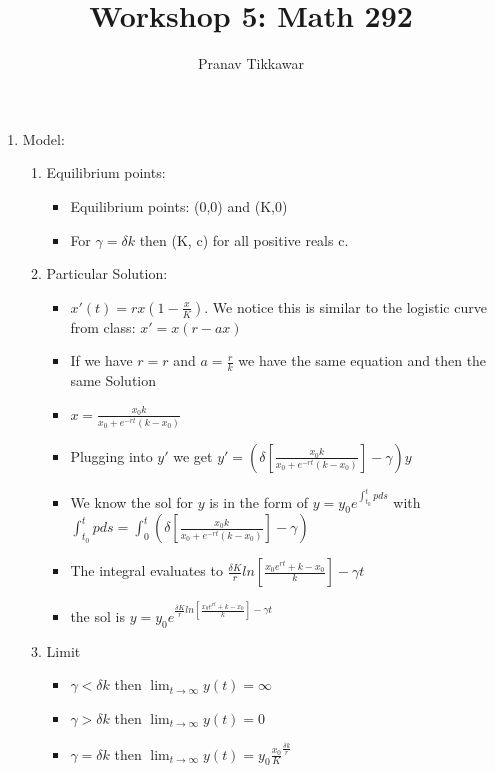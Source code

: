 \documentclass{article}
\author{Pranav Tikkawar}
\title{Workshop 5: Math 292}
\begin{document}
\maketitle
\begin{enumerate}
    \item Model: \begin{enumerate}
        \item Equilibrium points: \begin{itemize}
            \item Equilibrium points: (0,0) and (K,0)
            \item For $\gamma = \delta k$ then (K, c) for all positive reals c.  
        \end{itemize}
        \item Particular Solution: \begin{itemize}
            \item $x'(t) = rx(1-\frac{x}{K})$. We notice this is similar to the logistic curve from class: $x' = x(r-ax)$
            \item If we have $r = r$ and $a = \frac{r}{k}$ we have the same equation and then the same Solution
            \item $x = \frac{x_0 k}{x_0 + e^{-rt}(k-x_0)}$
            \item Plugging into $y'$ we get $y'=(\delta [\frac{x_0 k}{x_0 + e^{-rt}(k-x_0)}] - \gamma)y$
            \item We know the sol for $y$ is in the form of $y = y_0 e^{\int_{t_0}^{t}p ds}$ with $\int_{t_0}^{t}p ds = \int_{0}^{t}(\delta [\frac{x_0 k}{x_0 + e^{-rt}(k-x_0)}] - \gamma) $
            \item The integral evaluates to $\frac{\delta K }{r} ln[\frac{x_0 e^{rt} + k - x_0 }{k}] - \gamma t $ 
            \item the sol is $y = y_0 e^{\frac{\delta K }{r} ln[\frac{x_0 e^{rt} + k - x_0 }{k}] - \gamma t }$
        \end{itemize}
        \item Limit \begin{itemize}
            \item $\gamma < \delta k$ then $\lim_{t \rightarrow \infty} y(t) = \infty$
            \item $\gamma > \delta k$ then $\lim_{t \rightarrow \infty} y(t) = 0$
            \item $\gamma = \delta k$ then $\lim_{t \rightarrow \infty} y(t) = y_0 \frac{x_0}{K}^{\frac{\delta k}{r}} $
        \end{itemize}

\end{enumerate}
\end{enumerate}
\end{document}
